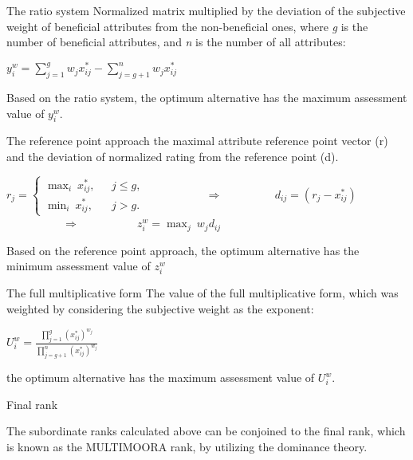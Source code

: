 \documentclass{beamer}
\begin{document}
	\begin{frame}{}
				\hypertarget{4}{}
		\tiny
		\begin{block}{The ratio system}
				Normalized matrix multiplied by the deviation of the subjective weight of beneficial attributes from the non-beneficial ones, where \emph{g} is the number of beneficial attributes, and \emph{n}  is the number of all attributes:
			
			
			
			$ 	y^{w}_{i}=\sum_{j=1}^{g}  w_{j} {x^{*}_{ij}}-\sum_{j=g+1}^{n} w_{j} x^{*}_{ij} $
			
			Based on the ratio system, the optimum alternative  has the maximum assessment value of $y^{w}_{i}$.
		
			
		\end{block}
	
	\begin{block}{The reference point approach}
the maximal attribute reference point vector (r) and the deviation of normalized rating from the reference point (d).


$ 	r_{j}= \left\{
	\begin{aligned}
		\max_{i}~x^{*}_{ij}, ~~~& j \leq g,\\
		\min_{i}~x^{*}_{ij}, ~~~& j > g.
	\end{aligned} \right.
 $
~~~~~~~~~~$ \Longrightarrow $ ~~~~~~~~
$ 	d_{ij}=(r_{j}-x^{*}_{ij}) $
~~~~~~~~~~$ \Longrightarrow $ ~~~~~~~~~
$ 	z^{w}_{i} =\max_{j}~w_{j}d_{ij} $


Based on the reference point approach, the optimum alternative has the minimum assessment value of $ z^{w}_{i} $%

	\end{block}

\begin{block}{The full multiplicative form}
	The value of the full multiplicative form, which was weighted by considering the subjective weight as the exponent:

$ 	{U}^{w}_{i}=\frac{\prod_{j=1}^{g}(x_{ij}^{*})^{w_{j}}}{\prod_{j=g+1}^{n}(x_{ij}^{*})^{w_{j}}} $


the optimum alternative  has the maximum assessment value of ${U}^{w}_{i}$.

\end{block}

\begin{block}{Final rank}
	
The subordinate ranks calculated above can be conjoined to the final rank, which is known as the MULTIMOORA rank, by utilizing the dominance theory.
\end{block}
	\end{frame}       
\end{document}
